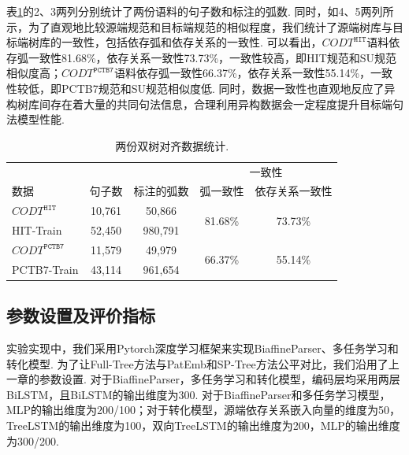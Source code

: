 表\ref{tb:two_conversion_data}的2、3两列分别统计了两份语料的句子数和标注的弧数. 同时，如4、5两列所示，为了直观地比较源端规范和目标端规范的相似程度，我们统计了源端树库与目标端树库的一致性，包括依存弧和依存关系的一致性. %
可以看出，$CODT^{\texttt{HIT}}$语料依存弧一致性81.68\%，依存关系一致性73.73\%，一致性较高，即HIT规范和SU规范相似度高；$CODT^{\texttt{PCTB7}}$语料依存弧一致性66.37\%，依存关系一致性55.14\%，一致性较低，即PCTB7规范和SU规范相似度低. 同时，数据一致性也直观地反应了异构树库间存在着大量的共同句法信息，合理利用异构数据会一定程度提升目标端句法模型性能.
\begin{table}[hb!]
    \addtolength{\tabcolsep}{+0.0mm}
    \centering
    \caption{两份双树对齐数据统计. }
    \label{tb:two_conversion_data}
    \begin{tabular}{l cc cc}
        \toprule
                                &        &            & \multicolumn{2}{c}{一致性}                              \\
        \cmidrule(lr){4-5}
        数据                    & 句子数 & 标注的弧数 & 弧一致性                   & 依存关系一致性             \\
        \midrule
        $CODT^{\texttt{HIT}}$   & 10,761 & 50,866     & \multirow{2}{1cm}{81.68\%} &
        \multirow{2}{1cm}{73.73\%}                                                                              \\
        HIT-Train               & 52,450 & 980,791    &                            &                            \\
        \midrule
        $CODT^{\texttt{PCTB7}}$ & 11,579 & 49,979     & \multirow{2}{1cm}{66.37\%} & \multirow{2}{1cm}{55.14\%} \\
        PCTB7-Train             & 43,114 & 961,654    &                            &                            \\
        \bottomrule
    \end{tabular}

\end{table}

\subsection{参数设置及评价指标}
实验实现中，我们采用Pytorch深度学习框架来实现BiaffineParser、多任务学习和转化模型. 为了让Full-Tree方法与PatEmb和SP-Tree方法公平对比，我们沿用了上一章的参数设置. 对于BiaffineParser，多任务学习和转化模型，编码层均采用两层BiLSTM，且BiLSTM的输出维度为300. 对于BiaffineParser和多任务学习模型，MLP的输出维度为200/100；对于转化模型，源端依存关系嵌入向量的维度为50，TreeLSTM的输出维度为100，双向TreeLSTM的输出维度为200，MLP的输出维度为300/200.

